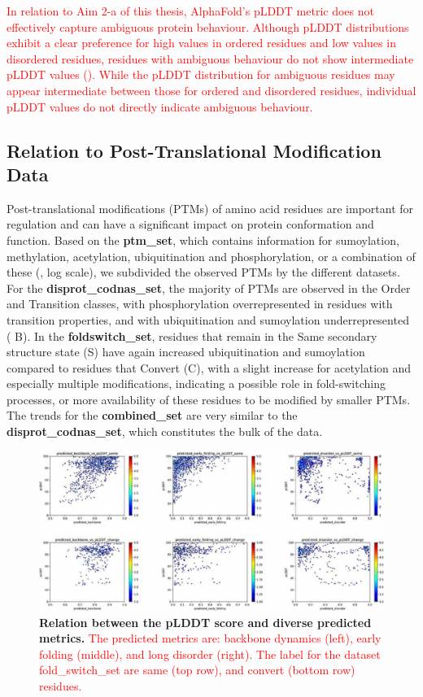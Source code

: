 \textcolor{red}{In relation to Aim 2-a of this thesis, AlphaFold's pLDDT metric does not effectively capture ambiguous protein behaviour. Although pLDDT distributions exhibit a clear preference for high values in ordered residues and low values in disordered residues, residues with ambiguous behaviour do not show intermediate pLDDT values (). While the pLDDT distribution for ambiguous residues may appear intermediate between those for ordered and disordered residues, individual pLDDT values do not directly indicate ambiguous behaviour.}


\subsection{Relation to Post-Translational Modification Data}

Post-translational modifications (PTMs) of amino acid residues are important for regulation and can have a significant impact on protein conformation and function. Based on the \textbf{ptm_set}, which contains information for sumoylation, methylation, acetylation, ubiquitination and phosphorylation, or a combination of these (, log scale), we subdivided the observed PTMs by the different datasets. For the \textbf{disprot_codnas_set}, the majority of PTMs are observed in the Order and Transition classes, with phosphorylation overrepresented in residues with transition properties, and with ubiquitination and sumoylation underrepresented ( B). In the \textbf{foldswitch_set}, residues that remain in the Same secondary structure state (S) have again increased ubiquitination and sumoylation compared to residues that Convert (C), with a slight increase for acetylation and especially multiple modifications, indicating a possible role in fold-switching processes, or more availability of these residues to be modified by smaller PTMs. The trends for the \textbf{combined_set} are very similar to the \textbf{disprot_codnas_set}, which constitutes the bulk of the data.

\begin{figure}[tbh]
    \centering
    \includegraphics[width=\linewidth]{ambiguous//figures_ambiguous/fig7.pdf}
    \caption{\textbf{Relation between the pLDDT score and diverse predicted metrics.} \textcolor{red}{The predicted metrics are: backbone dynamics (left), early folding (middle), and long disorder (right). The label for the dataset fold_switch_set are same (top row), and convert (bottom row) residues.}}
    \label{fig:chapter5:fig7}
\end{figure}

